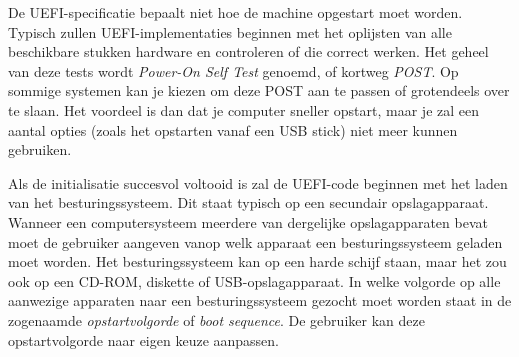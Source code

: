 
De UEFI-specificatie bepaalt niet hoe de machine opgestart moet worden. Typisch zullen UEFI-implementaties beginnen met
het oplijsten van alle beschikbare stukken hardware en controleren of die correct werken. Het geheel van deze tests
wordt \emph{Power-On Self Test} genoemd, of kortweg \emph{POST}. Op sommige systemen kan je kiezen om deze POST
aan te passen of grotendeels over te slaan. Het voordeel is dan dat je computer sneller opstart, maar je zal een aantal
opties (zoals het opstarten vanaf een USB stick) niet meer kunnen gebruiken.


Als de initialisatie succesvol voltooid is zal de UEFI-code beginnen met
het laden van het besturingssysteem. Dit staat typisch op een
secundair opslagapparaat. Wanneer een computersysteem meerdere van
dergelijke opslagapparaten bevat moet de gebruiker aangeven vanop
welk apparaat een besturingssysteem geladen moet worden. Het
besturingssysteem kan op een harde schijf staan, maar het zou ook op
een CD-ROM, diskette of USB-opslagapparaat. In welke volgorde op alle
aanwezige apparaten naar een besturingssysteem gezocht moet worden
staat in de zogenaamde \emph{opstartvolgorde} of
\emph{boot sequence}. De gebruiker kan deze opstartvolgorde naar eigen keuze aanpassen.

